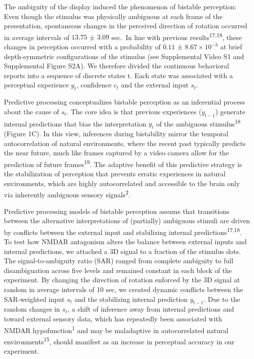 \documentclass[
]{article}
\begin{document}
The ambiguity of the display induced the phenomenon of bistable
perception: Even though the stimulus was physically ambiguous at each
frame of the presentation, spontaneous changes in the perceived
direction of rotation occurred in average intervals of \(13.75\) ±
\(3.09\) sec.~In line with previous results\textsuperscript{17,18},
these changes in perception occurred with a probability of \(0.11\) ±
\(\ensuremath{8.67\times 10^{-3}}\) at brief depth-symmetric
configurations of the stimulus (see Supplemental Video S1 and
Supplemental Figure S2A). We therefore divided the continuous behavioral
reports into a sequence of discrete states t. Each state was associated
with a perceptual experience \(y_t\), confidence \(c_t\) and the
external input \(s_t\).

Predictive processing conceptualizes bistable perception as an
inferential process about the cause of \(s_t\). The core idea is that
previous experiences (\(y_{t-1}\)) generate internal predictions that
bias the interpretation \(y_t\) of the ambiguous
stimulus\textsuperscript{18} (Figure 1C). In this view, inferences
during bistability mirror the temporal autocorrelation of natural
environments, where the recent past typically predicts the near future,
much like frames captured by a video camera allow for the prediction of
future frames\textsuperscript{19}. The adaptive benefit of this
predictive strategy is the stabilization of perception that prevents
erratic experiences in natural environments, which are highly
autocorrelated and accessible to the brain only via inherently ambiguous
sensory signals\textsuperscript{2}.

Predictive processing models of bistable perception assume that
transitions between the alternative interpretations of (partially)
ambiguous stimuli are driven by conflicts between the external input and
stabilizing internal predictions\textsuperscript{17,18}. To test how
NMDAR antagonism alters the balance between external inputs and internal
predictions, we attached a 3D signal to a fraction of the stimulus dots.
The signal-to-ambiguity ratio (SAR) ranged from complete ambiguity to
full disambiguation across five levels and remained constant in each
block of the experiment. By changing the direction of rotation enforced
by the 3D signal at random in average intervals of 10 sec, we created
dynamic conflicts between the SAR-weighted input \(s_t\) and the
stabilizing internal prediction \(y_{t-1}\). Due to the random changes
in \(s_t\), a shift of inference away from internal predictions and
toward external sensory data, which has repeatedly been associated with
NMDAR hypofunction\textsuperscript{1} and may be maladaptive in
autocorrelated natural environments\textsuperscript{15}, should manifest
as an increase in perceptual accuracy in our experiment.
\end{document}
